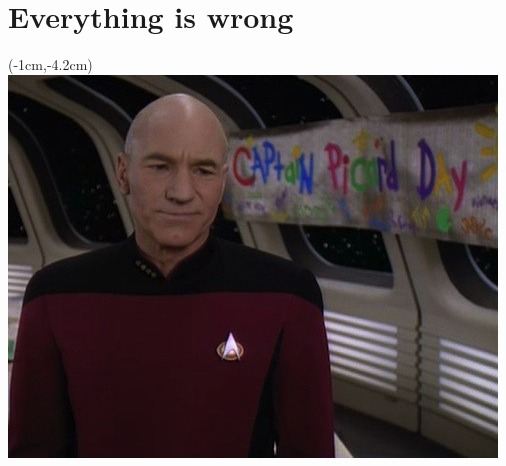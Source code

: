 \documentclass[xelatex,14pt]{beamer}
\begin{document}
\section{Everything is wrong}
\begin{frame}
\begin{textblock*}{0cm}(-1cm,-4.2cm)
	\includegraphics[width=1.0\paperwidth]{picarddday.jpg}
\end{textblock*}
\end{frame}
\end{document}
